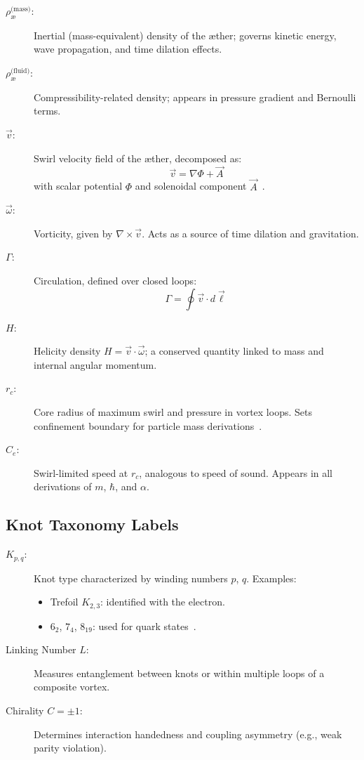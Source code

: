 \documentclass[12pt]{article}
\begin{document}
            \begin{description}
                \item[$\rho_{\text{\ae}}^{\text{(mass)}}$:] Inertial (mass-equivalent) density of the æther; governs kinetic energy, wave propagation, and time dilation effects.
                \item[$\rho_{\text{\ae}}^{\text{(fluid)}}$:] Compressibility-related density; appears in pressure gradient and Bernoulli terms.
                \item[$\vec{v}$:] Swirl velocity field of the æther, decomposed as:
                \[
                \vec{v} = \nabla \Phi + \vec{A}
                \]
                with scalar potential $\Phi$ and solenoidal component $\vec{A}$~\cite{kleckner2013knots}.
                \item[$\vec{\omega}$:] Vorticity, given by $\nabla \times \vec{v}$. Acts as a source of time dilation and gravitation.
                \item[$\Gamma$:] Circulation, defined over closed loops:
                \[
                \Gamma = \oint \vec{v} \cdot d\vec{\ell}
                \]
                \item[$H$:] Helicity density $H = \vec{v} \cdot \vec{\omega}$; a conserved quantity linked to mass and internal angular momentum.
                \item[$r_c$:] Core radius of maximum swirl and pressure in vortex loops. Sets confinement boundary for particle mass derivations~\cite{verlinde2011origin}.
                \item[$C_e$:] Swirl-limited speed at $r_c$, analogous to speed of sound. Appears in all derivations of $m$, $\hbar$, and $\alpha$.
            \end{description}
        
            \subsection{Knot Taxonomy Labels}
        
            \begin{description}
                \item[$K_{p,q}$:] Knot type characterized by winding numbers $p$, $q$. Examples:
                \begin{itemize}
                    \item Trefoil $K_{2,3}$: identified with the electron.
                    \item $6_2$, $7_4$, $8_{19}$: used for quark states~\cite{moffatt1969knottedness}.
                \end{itemize}
        
                \item[Linking Number $L$:] Measures entanglement between knots or within multiple loops of a composite vortex.
        
                \item[Chirality $C = \pm 1$:] Determines interaction handedness and coupling asymmetry (e.g., weak parity violation).
            \end{description}
        
\end{document}
